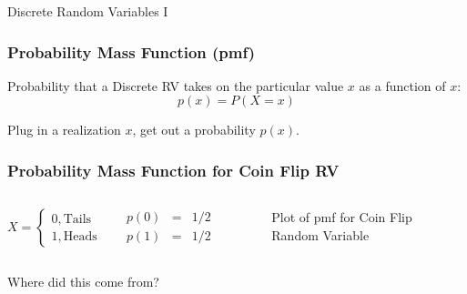 \begin{frame}

\centering \Huge Discrete Random Variables I

\end{frame}
\begin{frame}
\frametitle{Probability Mass Function (pmf)}
 Probability that a \alert{Discrete RV} takes on the particular value $x$ as a function of $x$:
 $$p(x) = P(X =x)$$

 

\begin{alertblock}{Plug in a realization $x$, get out a probability  $p(x)$.}\end{alertblock}

 


\end{frame}
\begin{frame}
\frametitle{Probability Mass Function for Coin Flip RV}

\begin{columns}
$$X = \left\{ \begin{array}{l}  0, \mbox{Tails}\\ 1, \mbox{Heads}\end{array} \right.$$

\begin{eqnarray*}
	p(0) &=& 1/2\\
	p(1) &=& 1/2
\end{eqnarray*}


\begin{figure}
\centering
{}
\caption{Plot of pmf for Coin Flip Random Variable}
\end{figure}
\end{columns}

\vspace{3em}
\alert{Where did this come from?}

\end{frame}


